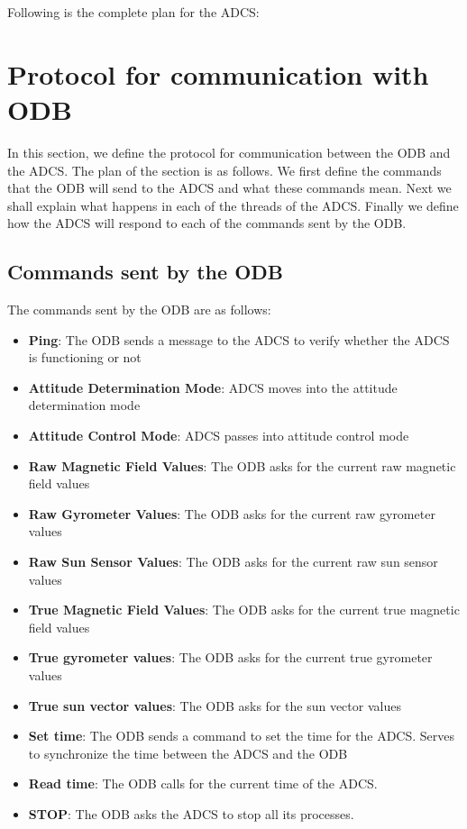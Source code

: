 \documentclass[11pt,a4paper]{report}
\begin{document}
Following is the complete plan for the ADCS: 



\chapter{Protocol for communication with ODB} \thispagestyle{fancy}

In this section, we define the protocol for communication between the ODB and the ADCS. The plan of the section is as follows. We first define the commands that the ODB will send to the ADCS and what these commands mean. Next we shall explain what happens in each of the threads of the ADCS. Finally we define how the ADCS will respond to each of the commands sent by the ODB. 

\section{Commands sent by the ODB} 

The commands sent by the ODB are as follows: 

	\begin{itemize}
		\item 
		\textbf{Ping}: The ODB sends a message to the ADCS to verify whether the ADCS is functioning or not
		\item 
		\textbf{Attitude Determination Mode}: ADCS moves into the attitude determination mode 
		\item 
		\textbf{Attitude Control Mode}: ADCS passes into attitude control mode 
		\item 
		\textbf{Raw Magnetic Field Values}: The ODB asks for the current raw magnetic field values 
		\item 
		\textbf{Raw Gyrometer Values}: The ODB asks for the current raw gyrometer values 
		\item 
		\textbf{Raw Sun Sensor Values}: The ODB asks for the current raw sun sensor values 
		\item 
		\textbf{True Magnetic Field Values}: The ODB asks for the current true magnetic field values 
		\item
		\textbf{True gyrometer values}: The ODB asks for the current true gyrometer values
		\item 
		\textbf{True sun vector values}: The ODB asks for the sun vector values 
		\item 
		\textbf{Set time}: The ODB sends a command to set the time for the ADCS. Serves to synchronize the time between the ADCS
							and the ODB 
		\item 
		\textbf{Read time}: The ODB calls for the current time of the ADCS. 
		\item 
		\textbf{STOP}: The ODB asks the ADCS to stop all its processes. 
	\end{itemize}
 
\end{document}
